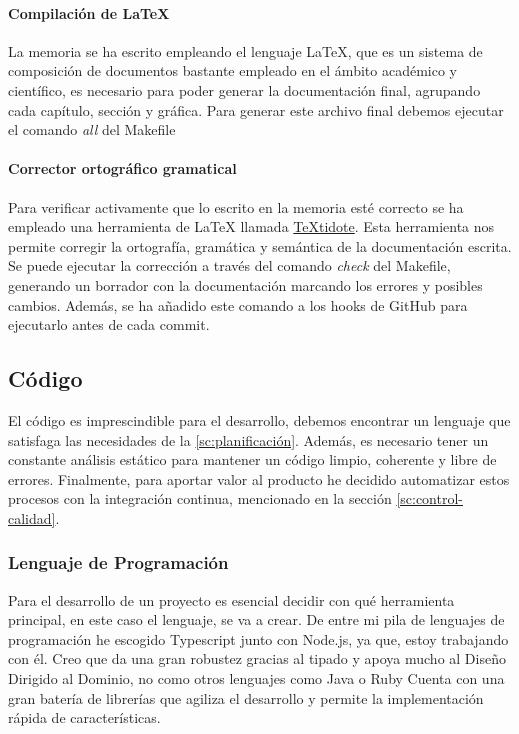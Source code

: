 \paragraph*{Compilación de LaTeX}
La memoria se ha escrito empleando el lenguaje LaTeX, que es un sistema de composición de documentos bastante empleado
en el ámbito académico y científico, es necesario para poder generar la documentación final, agrupando cada capítulo, sección y
gráfica. Para generar este archivo final debemos ejecutar el comando \textit{all} del Makefile

\paragraph*{Corrector ortográfico gramatical}
Para verificar activamente que lo escrito en la memoria esté correcto se ha empleado una herramienta de LaTeX llamada \href{https://github.com/sylvainhalle/textidote}{TeXtidote}.
Esta herramienta nos permite corregir la ortografía, gramática y semántica de la documentación escrita. Se puede ejecutar la corrección a través del comando \textit{check} del Makefile,
generando un borrador con la documentación marcando los errores y posibles cambios. Además, se ha añadido este comando a los hooks de GitHub para ejecutarlo antes de cada commit.

\subsection{Código}
El código es imprescindible para el desarrollo, debemos encontrar un lenguaje que satisfaga las necesidades de la \ref{sc:planificación}.
Además, es necesario tener un constante análisis estático para mantener un código limpio, coherente y libre de errores.
Finalmente, para aportar valor al producto he decidido automatizar estos procesos con la integración continua, mencionado en la sección \ref{sc:control-calidad}.

\subsubsection*{Lenguaje de Programación}
Para el desarrollo de un proyecto es esencial decidir con qué herramienta principal, en este caso el lenguaje, se va a crear. De entre mi pila de lenguajes de programación he
escogido Typescript junto con Node.js, ya que, estoy trabajando con él. Creo que da una gran robustez gracias al tipado y apoya mucho al Diseño Dirigido al Dominio, no como otros lenguajes como Java o Ruby
Cuenta con una gran batería de librerías que agiliza el desarrollo y permite la implementación rápida de características.


